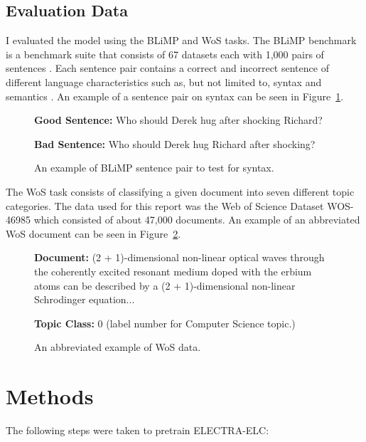 \documentclass[11pt]{article}
\begin{document}
\subsection{Evaluation Data}

I evaluated the model using the BLiMP and WoS tasks. 
The BLiMP benchmark is a benchmark suite that consists of 67 datasets 
each with 1,000 pairs of sentences
\cite{warstadt2023blimpbenchmarklinguisticminimal}. Each sentence pair contains a correct
and incorrect sentence of different language characteristics such as, but not limited to,
syntax and semantics \cite{warstadt2023blimpbenchmarklinguisticminimal}. An example of a sentence pair on syntax can be seen in
Figure~\ref{fig:blimp_ex}. 

\begin{figure}
    \textbf{Good Sentence:} Who should Derek hug after shocking Richard?

    \textbf{Bad Sentence:} Who should Derek hug Richard after shocking?
    \caption{An example of BLiMP sentence pair to test for syntax.}
    \label{fig:blimp_ex}
\end{figure}


The WoS task consists of classifying a given document into seven different topic
categories. The data used for this report was the Web of Science Dataset WOS-46985
\cite{kowsari2017HDLTex} which consisted of about 47,000 documents. An example of
an abbreviated WoS document can be seen in Figure~\ref{fig:wos_ex}.

\begin{figure}
    \textbf{Document:} (2 + 1)-dimensional non-linear optical waves through the coherently excited resonant medium doped with the erbium atoms can be described by a (2 + 1)-dimensional non-linear Schrodinger equation...

    \textbf{Topic Class:} 0 (label number for Computer Science topic.)
    \caption{An abbreviated example of WoS data.}
    \label{fig:wos_ex}
\end{figure}


\section{Methods}

The following steps were taken to pretrain ELECTRA-ELC:
\end{document}
